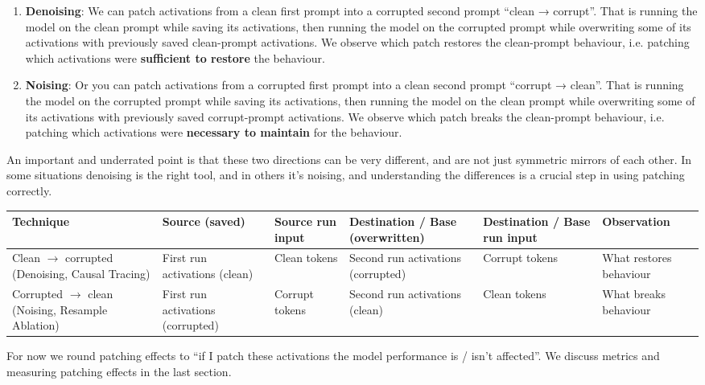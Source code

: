 \documentclass[nonatbib]{article}
\begin{document}
\begin{enumerate}
    \item \textbf{Denoising}: We can patch activations from a clean first prompt into a corrupted second prompt “clean → corrupt”. That is running the model on the clean prompt while saving its activations, then running the model on the corrupted prompt while overwriting some of its activations with previously saved clean-prompt activations. We observe which patch restores the clean-prompt behaviour, i.e. patching which activations were \textbf{sufficient to restore} the behaviour.
    \item \textbf{Noising}: Or you can patch activations from a corrupted first prompt into a clean second prompt “corrupt → clean”. That is running the model on the corrupted prompt while saving its activations, then running the model on the clean prompt while overwriting some of its activations with previously saved corrupt-prompt activations. We observe which patch breaks the clean-prompt behaviour, i.e. patching which activations were \textbf{necessary to maintain} for the behaviour.
\end{enumerate}

An important and underrated point is that these two directions can be very different, and are not just symmetric mirrors of each other. In some situations denoising is the right tool, and in others it’s noising, and understanding the differences is a crucial step in using patching correctly.


\begin{adjustbox}{width=1.2\textwidth,center=\textwidth}
  \begin{tabular}{p{3.6cm}p{2.5cm}lp{3.5cm}p{2.3cm}p{1.89cm}}
    \toprule
    Technique & Source (saved) & Source run input & Destination / Base (overwritten) & Destination / Base run input & Observation \\
    \midrule
    Clean $\rightarrow$ corrupted (Denoising, Causal Tracing\footnotemark[2]) & First run activations (clean) & Clean tokens & Second run activations (corrupted) & Corrupt tokens & What restores behaviour \\
    Corrupted $\rightarrow$ clean (Noising, Resample Ablation) & First run activations (corrupted) & Corrupt tokens & Second run activations (clean) & Clean tokens & What breaks behaviour \\
    \bottomrule
  \end{tabular}
\end{adjustbox}

For now we round patching effects to “if I patch these activations the model performance is / isn’t affected”. We discuss metrics and measuring patching effects in the last section.
\end{document}
